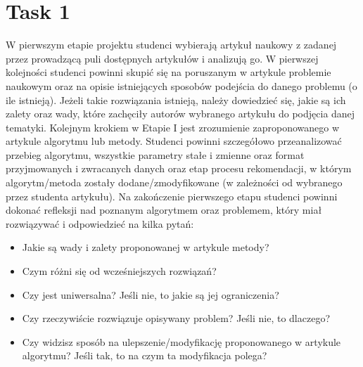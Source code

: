 \documentclass[a4paper]{LTJournalArticle}
\begin{document}
	\section{Task 1}
	W pierwszym etapie projektu studenci wybierają artykuł naukowy
	z zadanej przez prowadzącą puli dostępnych artykułów i analizują go.
	W pierwszej kolejności studenci powinni skupić się na poruszanym w artykule
	problemie naukowym oraz na opisie istniejących sposobów podejścia do
	danego problemu (o ile istnieją). Jeżeli takie rozwiązania istnieją, należy
	dowiedzieć się, jakie są ich zalety oraz wady, które zachęciły autorów
	wybranego artykułu do podjęcia danej tematyki.
	Kolejnym krokiem w Etapie I jest zrozumienie zaproponowanego
	w artykule algorytmu lub metody. Studenci powinni szczegółowo przeanalizować
	przebieg algorytmu, wszystkie parametry stałe i zmienne oraz format
	przyjmowanych i zwracanych danych oraz etap procesu rekomendacji, w którym
	algorytm/metoda zostały dodane/zmodyfikowane (w zależności od wybranego
	przez studenta artykułu).
	Na zakończenie pierwszego etapu studenci powinni dokonać refleksji nad
	poznanym algorytmem oraz problemem, który miał rozwiązywać i odpowiedzieć
	na kilka pytań:
	\begin{itemize}
		\item Jakie są wady i zalety proponowanej w artykule metody?
		\item Czym różni się od wcześniejszych rozwiązań?
		\item Czy jest uniwersalna? Jeśli nie, to jakie są jej ograniczenia?
		\item Czy rzeczywiście rozwiązuje opisywany problem? Jeśli nie, to dlaczego?
		\item Czy widzisz sposób na ulepszenie/modyfikację proponowanego w artykule algorytmu? Jeśli tak, to na czym ta modyfikacja polega?
	\end{itemize}
\end{document}
